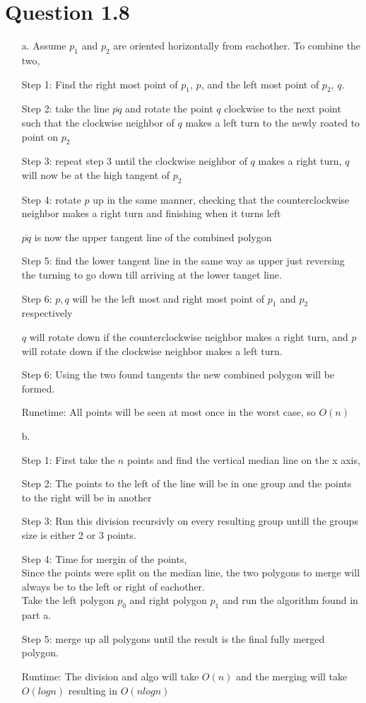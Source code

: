 \documentclass[12pt]{article}
\begin{document}
\section*{Question 1.8}
\begin{itemize}
    \item[a.] Assume $p_1$ and $p_2$ are oriented horizontally from eachother. To combine the two,
    \item[Step 1:] Find the right most point of $p_1$, $p$, and the left most point of $p_2$, $q$.
    \item[Step 2:] take the line $\overline{pq}$ and rotate the point $q$ clockwise to the next point such that the clockwise neighbor of $q$ makes a left turn to the newly roated to point on $p_2$
    \item[Step 3:] repeat step 3 until the clockwise neighbor of $q$ makes a right turn, $q$ will now be at the high tangent of $p_2$
    \item[Step 4:] rotate $p$ up in the same manner, checking that the counterclockwise neighbor makes a right turn and finishing when it turns left
    \item[]$\overline{pq}$ is now the upper tangent line of the combined polygon 
    \item[Step 5:] find the lower tangent line in the same way as upper just reversing the turning to go down till arriving at the lower tanget line.
    \item[Step 6:] $p,q$ will be the left most and right most point of $p_1$ and $p_2$ respectively
    \item[] $q$ will rotate down if the counterclockwise neighbor makes a right turn, and $p$ will rotate down if the clockwise neighbor makes a left turn.
    \item[Step 6:] Using the two found tangents the new combined polygon will be formed.
    \item[Runetime:] All points will be seen at most once in the worst case, so $O(n)$  
    \item[b.] 
    \item[Step 1:] First take the $n$ points and find the vertical median line on the x axis,
    \item[Step 2:] The points to the left of the line will be in one group and the points to the right will be in another
    \item[Step 3:] Run this division recursivly on every resulting group untill the groups size is either 2 or 3 points.
    \item[Step 4:] Time for mergin of the points,
    \\ Since the points were split on the median line, the two polygons to merge will always be to the left or right of eachother.
    \\ Take the left polygon $p_0$ and right polygon $p_1$ and run the algorithm found in part a.
    \item[Step 5:] merge up all polygons until the result is the final fully merged polygon.
    \item[Runtime:] The division and algo will take $O(n)$ and the merging will take $O(logn)$ resulting in $O(nlogn)$ 
\end{itemize}
\end{document}
